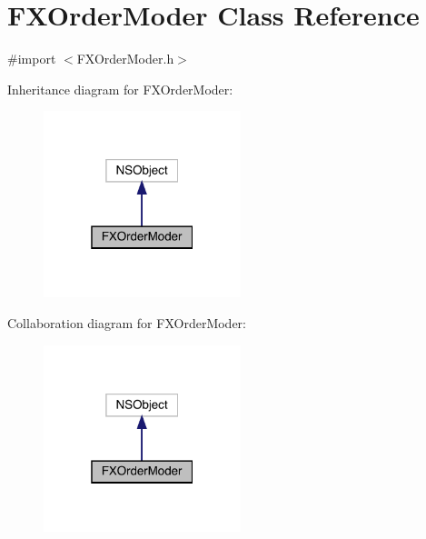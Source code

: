 \hypertarget{interface_f_x_order_moder}{}\section{F\+X\+Order\+Moder Class Reference}
\label{interface_f_x_order_moder}


{\ttfamily \#import $<$F\+X\+Order\+Moder.\+h$>$}



Inheritance diagram for F\+X\+Order\+Moder\+:\nopagebreak
\begin{figure}[H]
\begin{center}
\leavevmode
\includegraphics[width=163pt]{interface_f_x_order_moder__inherit__graph}
\end{center}
\end{figure}


Collaboration diagram for F\+X\+Order\+Moder\+:\nopagebreak
\begin{figure}[H]
\begin{center}
\leavevmode
\includegraphics[width=163pt]{interface_f_x_order_moder__coll__graph}
\end{center}
\end{figure}
